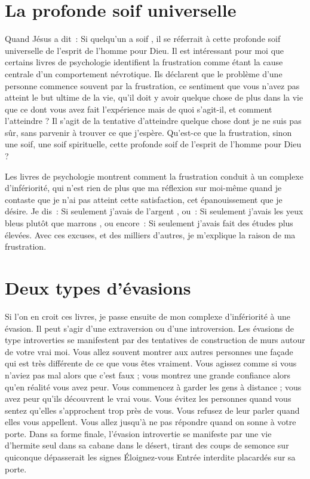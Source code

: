 \section{La profonde soif universelle}

Quand Jésus a dit~: \og Si quelqu'un a soif \fg{}, il se réferrait
 à cette profonde soif universelle de l'esprit de l'homme pour Dieu.
 Il est intéressant pour moi que certains livres de psychologie
 identifient la frustration comme étant la cause centrale
 d'un comportement névrotique. Ils déclarent que le problème
 d'une personne commence souvent par la frustration,
 ce sentiment que vous n'avez pas atteint le but ultime de la vie,
 qu'il doit y avoir quelque chose de plus dans la vie que ce dont
 vous avez fait l'expérience \ocadr mais de quoi s'agit-il, et comment
 l'atteindre ?
 Il s'agit de la tentative d'atteindre quelque chose dont je ne suis pas sûr,
 sans parvenir à trouver ce que j'espère. Qu'est-ce que la frustration,
 sinon une soif, une soif spirituelle, cette profonde soif de l'esprit
 de l'homme pour Dieu ?

\begin{specialpar}{}
Les livres de psychologie montrent comment la frustration con\-duit
 à un complexe d'infériorité, qui n'est rien de plus que ma réflexion
 sur moi-même quand je contaste que je n'ai pas atteint cette satisfaction,
 cet épanouissement que je désire. Je dis~:
 \og Si seulement j'avais de l'argent \fg{}, ou~:
 \og Si seulement j'avais les yeux bleus plutôt que marrons \fg{}, ou encore~:
 \og Si seulement j'avais fait des études plus élevées. \fg{}
 Avec ces excuses, et des milliers d'autres, je m'explique la raison
 de ma frustration.
\end{specialpar}


\section{Deux types d'\'evasions}

Si l'on en croit ces livres, je passe ensuite de mon complexe
 d'in\-fé\-rio\-ri\-té à une évasion.
 Il peut s'agir d'une extraversion ou d'une introversion.
 Les évasions de type introverties se manifestent par des tentatives
 de construction de murs autour de votre vrai moi.
 Vous allez souvent montrer aux autres personnes une façade qui est très
 différente de ce que vous êtes vraiment.
 Vous agissez comme si vous n'aviez pas mal alors que c'est faux ;
 vous montrez une grande confiance alors qu'en réalité vous avez peur.
 Vous commencez à garder les gens à distance ;
 vous avez peur qu'ils découvrent le vrai vous.
 Vous évitez les personnes quand vous sentez qu'elles s'approchent
 trop près de vous. Vous refusez de leur parler quand elles vous appellent.
 Vous allez jusqu'à ne pas répondre quand on sonne à votre porte.
 Dans sa forme finale, l'évasion introvertie se manifeste par une vie
 d'hermite seul dans sa cabane dans le désert, tirant des coups de semonce
 sur quiconque dépasserait les signes
 \og Éloignez-vous \ocadr Entrée interdite \fg{} placardés sur sa porte.

